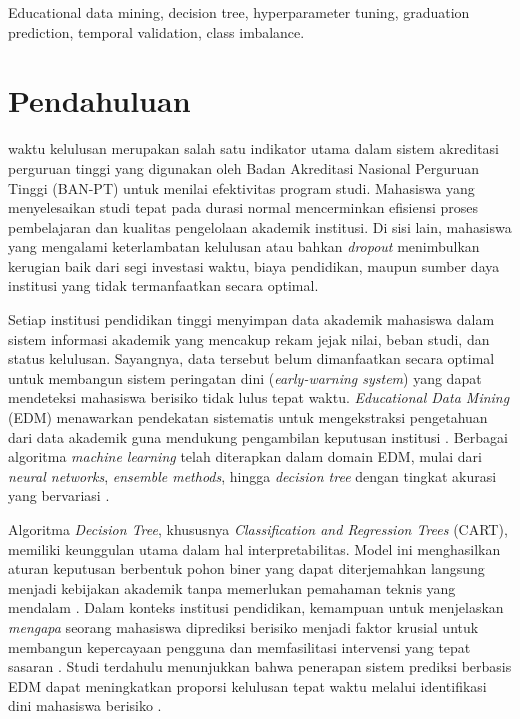 \documentclass{ieeeaccess}
\begin{document}
\begin{keywords}
Educational data mining, decision tree, hyperparameter tuning, graduation prediction, temporal validation, class imbalance.
\end{keywords}

\titlepgskip=-21pt

\maketitle

\section{Pendahuluan}
\label{sec:introduction}
 waktu kelulusan merupakan salah satu indikator utama dalam sistem akreditasi perguruan tinggi yang digunakan oleh Badan Akreditasi Nasional Perguruan Tinggi (BAN-PT) untuk menilai efektivitas program studi. Mahasiswa yang menyelesaikan studi tepat pada durasi normal mencerminkan efisiensi proses pembelajaran dan kualitas pengelolaan akademik institusi. Di sisi lain, mahasiswa yang mengalami keterlambatan kelulusan atau bahkan \emph{dropout} menimbulkan kerugian baik dari segi investasi waktu, biaya pendidikan, maupun sumber daya institusi yang tidak termanfaatkan secara optimal.

Setiap institusi pendidikan tinggi menyimpan data akademik mahasiswa dalam sistem informasi akademik yang mencakup rekam jejak nilai, beban studi, dan status kelulusan. Sayangnya, data tersebut belum dimanfaatkan secara optimal untuk membangun sistem peringatan dini (\emph{early-warning system}) yang dapat mendeteksi mahasiswa berisiko tidak lulus tepat waktu. \emph{Educational Data Mining} (EDM) menawarkan pendekatan sistematis untuk mengekstraksi pengetahuan dari data akademik guna mendukung pengambilan keputusan institusi \cite{ref10}. Berbagai algoritma \emph{machine learning} telah diterapkan dalam domain EDM, mulai dari \emph{neural networks}, \emph{ensemble methods}, hingga \emph{decision tree} dengan tingkat akurasi yang bervariasi \cite{ref1}.

Algoritma \emph{Decision Tree}, khususnya \emph{Classification and Regression Trees} (CART), memiliki keunggulan utama dalam hal interpretabilitas. Model ini menghasilkan aturan keputusan berbentuk pohon biner yang dapat diterjemahkan langsung menjadi kebijakan akademik tanpa memerlukan pemahaman teknis yang mendalam \cite{ref4}. Dalam konteks institusi pendidikan, kemampuan untuk menjelaskan \emph{mengapa} seorang mahasiswa diprediksi berisiko menjadi faktor krusial untuk membangun kepercayaan pengguna dan memfasilitasi intervensi yang tepat sasaran \cite{ref2}. Studi terdahulu menunjukkan bahwa penerapan sistem prediksi berbasis EDM dapat meningkatkan proporsi kelulusan tepat waktu melalui identifikasi dini mahasiswa berisiko \cite{ref5}.
\end{document}
